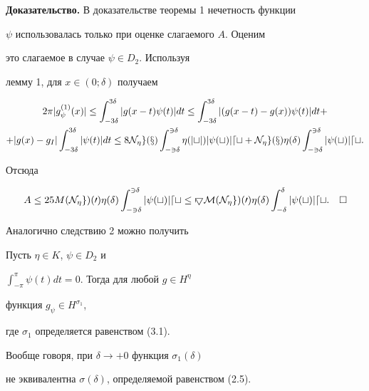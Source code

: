 {\bf Доказательство.} В доказательстве теоремы 1 нечетность функции


$\psi$ использовалась только при оценке слагаемого $A$. Оценим


это слагаемое в случае $\psi\in D_2$. Используя


лемму 1, для $x\in(0;\delta)$ получаем


\begin{multline*}


2\pi|g^{(1)}_\psi(x)|\le\int_{-3\delta}^{3\delta}|g(x-t)\psi(t)|dt\le


\int_{-3\delta}^{3\delta}|(g(x-t)-g(x))\psi(t)|dt+ \\


%


+|g(x)-g_I|\int_{-3\delta}^{3\delta}|\psi(t)|dt\le


8\N_\eta g(x)\int_{-3\delta}^{3\delta}\eta(|t|)|\psi(t)|dt+


\N_\eta g(x)\eta(\delta)\int_{-3\delta}^{3\delta}|\psi(t)|dt.


\end{multline*}


Отсюда


$$


A\le 25M(\N_\eta g)(0)\eta(\delta)\int_{-3\delta}^{3\delta}|\psi(t)|dt\le


75M(\N_\eta g)(0)\eta(\delta)\int_{-\delta}^\delta|\psi(t)|dt.


\quad\square


$$





Аналогично следствию 2 можно получить





\begin{cor}


Пусть $\eta\in K$, $\psi\in D_2$ и


$\int_{-\pi}^\pi\psi(t)dt=0$. Тогда для любой $g\in H^\eta$


функция $g_\psi\in H^{\sigma_1}$,


где $\sigma_1$ определяется равенством (3.1).


\end{cor}





Вообще говоря, при $\delta\to+0$ функция $\sigma_1(\delta)$


не эквивалентна $\sigma(\delta)$, определяемой равенством (2.5).


